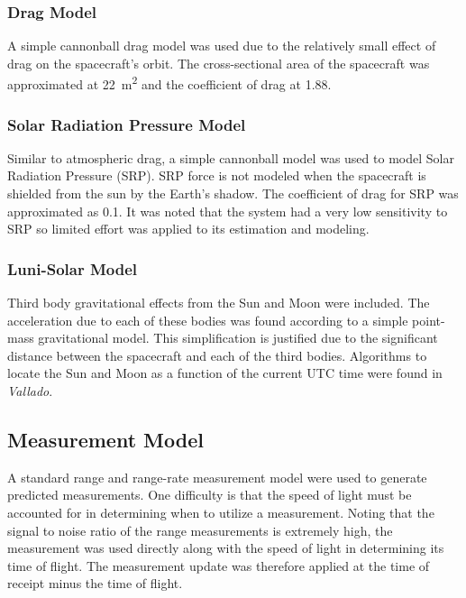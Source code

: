 \documentclass[11pt]{article}
\begin{document}
\subsubsection{Drag Model}

A simple cannonball drag model was used due to the relatively small effect of drag on the spacecraft's orbit. The cross-sectional area of the spacecraft was approximated at \SI{22}{\meter\squared} and the coefficient of drag at 1.88.

\subsubsection{Solar Radiation Pressure Model}

Similar to atmospheric drag, a simple cannonball model was used to model Solar Radiation Pressure (SRP). SRP force is not modeled when the spacecraft is shielded from the sun by the Earth's shadow. The coefficient of drag for SRP was approximated as 0.1. It was noted that the system had a very low sensitivity to SRP so limited effort was applied to its estimation and modeling.

\subsubsection{Luni-Solar Model}

Third body gravitational effects from the Sun and Moon were included. The acceleration due to each of these bodies was found according to a simple point-mass gravitational model. This simplification is justified due to the significant distance between the spacecraft and each of the third bodies. Algorithms to locate the Sun and Moon as a function of the current UTC time were found in \textit{Vallado}.

\subsection{Measurement Model}

A standard range and range-rate measurement model were used to generate predicted measurements. One difficulty is that the speed of light must be accounted for in determining when to utilize a measurement. Noting that the signal to noise ratio of the range measurements is extremely high, the measurement was used directly along with the speed of light in determining its time of flight. The measurement update was therefore applied at the time of receipt minus the time of flight.
\end{document}
